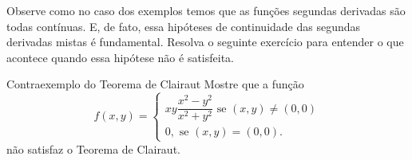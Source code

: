 Observe como no caso dos exemplos temos que as funções segundas derivadas são todas contínuas. E, de fato, essa hipóteses de continuidade das segundas derivadas mistas é fundamental. %
Resolva o seguinte exercício para entender o que acontece quando essa hipótese não é satisfeita.
\begin{exercise}{Contraexemplo do Teorema de Clairaut}{}
Mostre que a função
$$
f(x, y) = \begin{cases}
    x y \dfrac{x^2-y^2}{x^2+y^2} \text{ se }(x, y) \neq (0,0)\\[.5em]
   0, \text{ se } (x,y)=(0,0). 
\end{cases}
$$
não satisfaz o Teorema de Clairaut. 
\end{exercise}
\begin{comment}
\begin{example}{}{}
Consideremos a função
$$
f(x, y) = \begin{cases}
    x y \dfrac{x^2-y^2}{x^2+y^2} \text{ se }(x, y) \neq (0,0)\\[.5em]
   0, \text{ se } (x,y)=(0,0). 
\end{cases}
$$
Queremos mostrar que tal função não satisfaz o teorema de Clairaut na origem. 
Se $(x,y)\neq (0,0)$ segue que 
$$
\dfrac{\partial f}{\partial x}(x,y) = y \cdot \left(\dfrac{x^2-y^2}{x^2+y^2}+\dfrac{4 x^2 y^2}{\left(x^2+y^2\right)^2}\right)
$$
Para obter o valor de $\dfrac{\partial f}{\partial x}(0,0)$, usamos a definição geral:
\begin{align*}
\dfrac{\partial f}{\partial x}(0,0) 
& =\lim_{t \rightarrow 0} \dfrac{f(0+t,0)-f(0,0)}{t}\\[.5em]
& = \lim_{t \rightarrow 0}\, \dfrac{1}{t}\left( t \cdot 0 \cdot \dfrac{ t^2-0^2}{t^2+0^2}-0\right) =0.
\end{align*}
Concluimos que $\dfrac{\partial f}{\partial x}$ está definida e é contínua em $(0,0)$ pois
$$
\lim_{(x,y)\rightarrow (0,0)}\dfrac{\partial f}{\partial x}(x, y) 
=0 = \dfrac{\partial f}{\partial x}(0,0),
$$



\end{comment}
